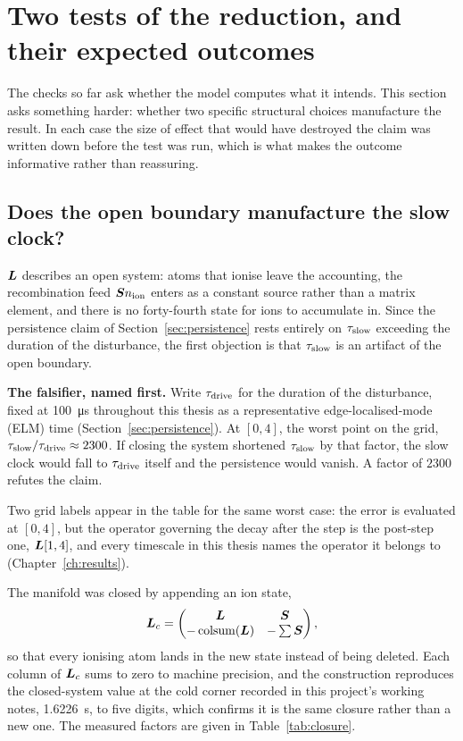 \section{Two tests of the reduction, and their expected outcomes}
\label{sec:attacks}

The checks so far ask whether the model computes what it intends. This section
asks something harder: whether two specific structural choices manufacture the
result. In each case the size of effect that would have destroyed the claim was
written down before the test was run, which is what makes the outcome
informative rather than reassuring.

\subsection{Does the open boundary manufacture the slow clock?}

$\bm{L}$ describes an open system: atoms that ionise leave the accounting, the
recombination feed $\bm{S}n_{\mathrm{ion}}$ enters as a constant source rather than a matrix
element, and there is no forty-fourth state for ions to accumulate in. Since the
persistence claim of Section~\ref{sec:persistence} rests entirely on $\tau_{\mathrm{slow}}$
exceeding the duration of the disturbance, the first objection is that
$\tau_{\mathrm{slow}}$ is an artifact of the open boundary.

\textbf{The falsifier, named first.} Write $\tau_{\mathrm{drive}}$ for the duration of the
disturbance, fixed at \SI{100}{\micro\second} throughout this thesis as a
representative edge-localised-mode (ELM) time
(Section~\ref{sec:persistence}). At $[0,4]$, the worst point on the grid,
$\tau_{\mathrm{slow}}/\tau_{\mathrm{drive}} \approx 2300$. If closing the system shortened $\tau_{\mathrm{slow}}$ by
that factor, the slow clock would fall to $\tau_{\mathrm{drive}}$ itself and the persistence
would vanish. A factor of $2300$ refutes the claim.

Two grid labels appear in the table for the same worst case: the error is
evaluated at $[0,4]$, but the operator governing the decay after the step is the
post-step one, $\bm{L}[1,4]$, and every timescale in this thesis names the
operator it belongs to (Chapter~\ref{ch:results}).

The manifold was closed by appending an ion state,
\begin{equation}
  \bm{L}_c =
  \begin{pmatrix}
    \bm{L} & \bm{S} \\
    -\operatorname{colsum}(\bm{L}) & -\textstyle\sum\bm{S}
  \end{pmatrix},
  \label{eq:closure_ch4}
\end{equation}
so that every ionising atom lands in the new state instead of being deleted.
Each column of $\bm{L}_c$ sums to zero to machine precision, and the construction
reproduces the closed-system value at the cold corner recorded in this
project's working notes, \SI{1.6226}{\second}, to five digits, which confirms it is the same
closure rather than a new one. The measured factors are given in
Table~\ref{tab:closure}.

